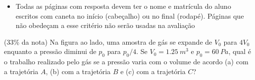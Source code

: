 \documentclass[12pt,a4paper,brazilian, fleqn]{article}
\newcommand{\ratio}[1]{(#1\% da nota)}
\begin{document}
\begin{tcolorbox}[colback=black!10, colframe=black!50, title=Observações]
    \begin{itemize}
        \item Todas as páginas com resposta devem ter o nome e matrícula do
            aluno escritos com caneta no início (cabeçalho) ou no final
            (rodapé). Páginas que não obedeçam a esse critério não serão usadas
            na avaliação
    \end{itemize}
\end{tcolorbox}

\vspace{2em}

\begin{enumerate}

        \begin{minipage}{0.45\textwidth}
        \item \ratio{33} Na figura ao lado, uma amostra de gás se expande de \(V_0\) para
            \(4V_0\) enquanto a pressão diminui de \(p_0\) para \(p_0/4\). Se \(V_0 = \SI{1.25}{m^3}\)
            e \(p_0=\SI{60}{Pa}\), qual é o trabalho realizado pelo gás se a pressão varia 
            com o volume de acordo (a) com a trajetória \(A\), (b) com a trajetória \(B\) e
            (c) com a trajetória \(C\)?
        \end{minipage}%
        \begin{minipage}{0.45\textwidth}
            \centering
        \end{minipage}


\end{enumerate}
\end{document}
